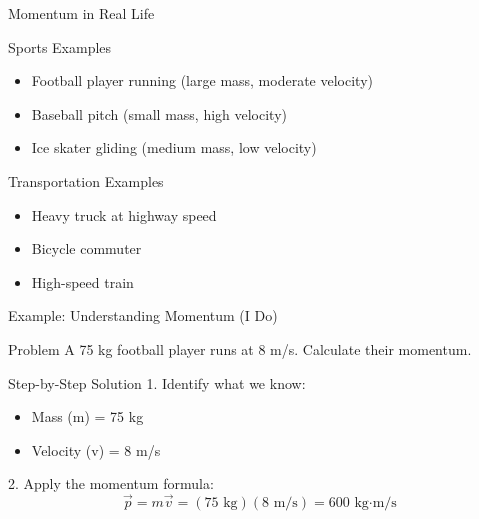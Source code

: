 \documentclass{beamer}
\begin{document}
\begin{frame}{Momentum in Real Life}
\begin{block}{Sports Examples}
\begin{itemize}
\item Football player running (large mass, moderate velocity)
\item Baseball pitch (small mass, high velocity)
\item Ice skater gliding (medium mass, low velocity)
\end{itemize}
\end{block}

\begin{block}{Transportation Examples}
\begin{itemize}
\item Heavy truck at highway speed
\item Bicycle commuter
\item High-speed train
\end{itemize}
\end{block}
\end{frame}

\begin{frame}{Example: Understanding Momentum (I Do)}
\begin{block}{Problem}
A 75 kg football player runs at 8 m/s. Calculate their momentum.
\end{block}

\pause

\begin{block}{Step-by-Step Solution}
1. Identify what we know:
   \begin{itemize}
   \item Mass (m) = 75 kg
   \item Velocity (v) = 8 m/s
   \end{itemize}

   \pause
   
2. Apply the momentum formula:
   $$\vec{p} = m\vec{v} = (75\text{ kg})(8\text{ m/s}) = 600\text{ kg⋅m/s}$$
\end{block}
\end{frame}
\end{document}
